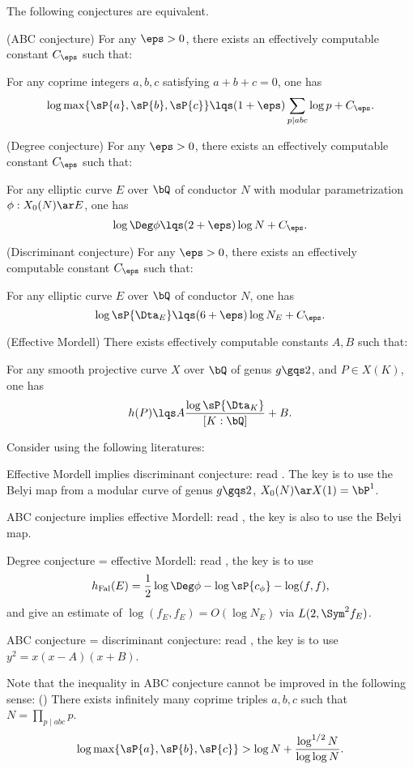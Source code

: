 \documentclass[article, a4paper, twoside]{universal}
\begin{document}
\begin{thm}
	The following conjectures are equivalent.
	\begin{enr}[label = (\arabic*)]
		\item (ABC conjecture) For any $\eps>0$, there exists an effectively computable constant $C_{\eps}$ such that:

		For any coprime integers $a,b,c$ satisfying $a+b+c=0$, one has
		\[
			\log\max\{\sP{a},\sP{b},\sP{c}\}\lqs(1+\eps)\sum_{p\mid abc}\log{p}+C_{\eps}.
		\]
		\item (Degree conjecture) For any $\eps>0$, there exists an effectively computable constant $C_{\eps}$ such that:

		For any elliptic curve $E$ over $\bQ$ of conductor $N$ with modular parametrization $\phi:X_{0}(N)\ar E$, one has
		\[
			\log\Deg\phi\lqs (2+\eps)\log{N}+C_{\eps}.
		\]
		\item (Discriminant conjecture) For any $\eps>0$, there exists an effectively computable constant $C_{\eps}$ such that:

		For any elliptic curve $E$ over $\bQ$ of conductor $N$, one has
		\[
			\log{\sP{\Dta_{E}}}\lqs (6+\eps)\log{N_{E}}+C_{\eps}.
		\]
		\item (Effective Mordell) There exists effectively computable constants $A,B$ such that:

		For any smooth projective curve $X$ over $\bQ$ of genus $g\gqs2$, and $P\in X(K)$, one has
		\[
			h(P)\lqs A\frac{\log{\sP{\Dta_{K}}}}{[K:\bQ]}+B.
		\]
	\end{enr}
\end{thm}



\begin{prf}

	Consider using the following literatures:
	\begin{itm}
		\item Effective Mordell implies discriminant conjecture: read \cite[Page~55]{MB1990Hauteurs}. The key is to use the Belyi map from a modular curve of genus $g\gqs2$, $X_{0}(N)\ar X(1)=\bP^{1}$.
		\item ABC conjecture implies effective Mordell: read \cite{Elkies1991ABC}, the key is also to use the Belyi map.
		\item Degree conjecture = effective Mordell: read \cite{MM1994Modular}, the key is to use
		\[
			h_{\text{Fal}}(E)=\frac{1}{2}\log\Deg\phi-\log\sP{c_{\phi}}-\log(f,f),
		\]
		and give an estimate of $\log(f_{E},f_{E})=O(\log{N_{E}})$  via $L(2,\Sym^{2}f_{E})$.
		\item ABC conjecture = discriminant conjecture: read \cite{Frey1989}, the key is to use $y^{2}=x(x-A)(x+B)$.
	\end{itm}

	Note that the inequality in ABC conjecture cannot be improved in the following sense: (\cite[Theorem~2]{ST1986})	There exists infinitely many coprime triples $a,b,c$ such that $N=\prod_{p\mid abc}p$.
	\[
		\log\max\{\sP{a},\sP{b},\sP{c}\}>\log{N}+\frac{\log^{1/2}{N}}{\log\log{N}}.
	\]
\end{prf}
\end{document}
